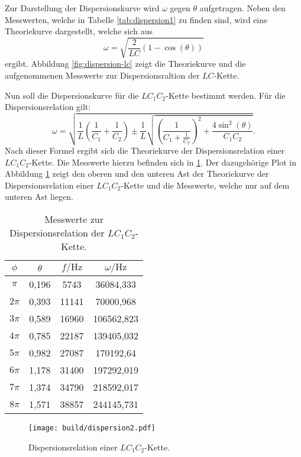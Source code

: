 Zur Darstellung der Dispersionskurve wird $\omega$ gegen $\theta$ aufgetragen. Neben den Messwerten, welche in Tabelle \ref{tab:dispersion1} zu finden sind, wird eine Theoriekurve dargestellt, welche sich aus
\begin{equation}
  \omega = \sqrt{\frac{2}{LC}(1-\cos(\theta))}
\end{equation}
 ergibt. Abbildung \ref{fig:dispersion-lc} zeigt die Theoriekurve und die aufgenommenen Messwerte zur Dispersionsraltion der $LC$-Kette.

 Nun soll die Dispersionskurve für die $LC_{1}C_{2}$-Kette bestimmt werden.
 Für die Dispersionsrelation gilt:
 \begin{equation}
  \omega = \sqrt{\frac{1}{L}\left(\frac{1}{C_{1}}+\frac{1}{C_{2}}\right)\pm\frac{1}{L}\sqrt{\left(\frac{1}{C_{1}+\frac{1}{C_2}}\right)^2 + \frac{4\sin^2(\theta)}{C_{1}C_{2}}}}.
  \end{equation}
  Nach dieser Formel ergibt sich die Theoriekurve der Dispersionsrelation einer $LC_{1}C_{2}$-Kette. Die Messwerte hierzu befinden sich in \ref{tab:dispersion2}. Der dazugehörige Plot in Abbildung \ref{fig:dispersion-lc1c2} zeigt den oberen und den unteren Ast der Theoriekurve der Dispersionsrelation einer $LC_{1}C_{2}$-Kette und die Messwerte, welche nur auf dem unteren Ast liegen.

\begin{table}
  \centering
  \caption{Messwerte zur Dispersionsrelation der $LC_{1}C_{2}$-Kette.}
  \label{tab:dispersion2}
  \begin{tabular}{c c c c}
    \toprule
    $\phi$ & $\theta$ & $f / \si{\hertz}$ & $\omega / \si{\hertz}$ \\
    \midrule
    $\pi$ & 0,196 & 5743 & 36084,333 \\
    $2\pi$ & 0,393 & 11141 & 70000,968 \\
    $3\pi$ & 0,589 & 16960 & 106562,823 \\
    $4\pi$ & 0,785 & 22187 & 139405,032 \\
    $5\pi$ & 0,982 & 27087 & 170192,64 \\
    $6\pi$ & 1,178 & 31400 & 197292,019 \\
    $7\pi$ & 1,374 & 34790 & 218592,017 \\
    $8\pi$ & 1,571 & 38857 & 244145,731 \\
    \bottomrule
    \end{tabular}
  \end{table}

  \begin{figure}
    \centering
    \texttt{[image: build/dispersion2.pdf]}
  \caption{Dispersionsrelation einer $LC_{1}C_{2}$-Kette.}
    \label{fig:dispersion-lc1c2}
  \end{figure}

